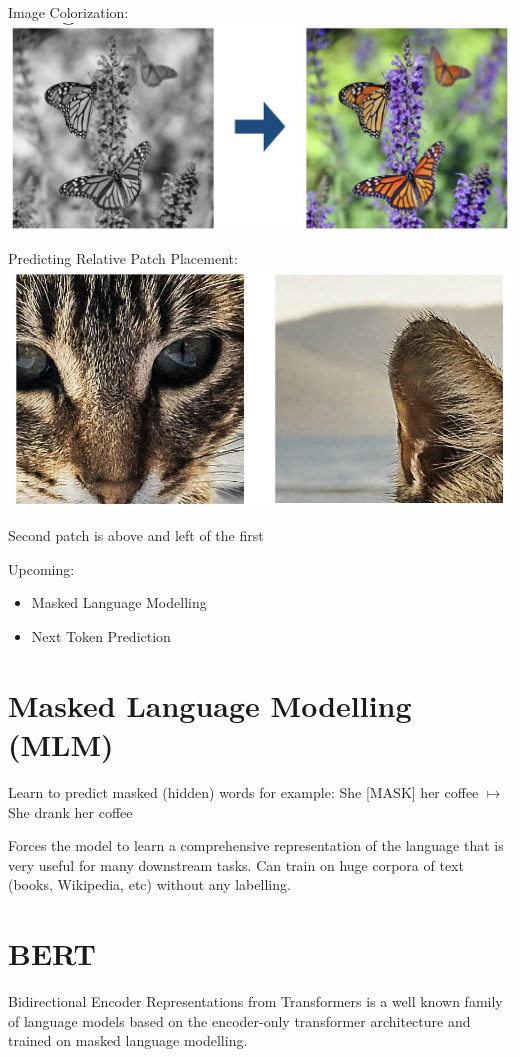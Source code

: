 \documentclass[10pt]{article}
\begin{document}
Image Colorization:
\includegraphics[max width=\textwidth, center]{2024_01_08_7c14f4867d7823fc5a52g-03(1)}

Predicting Relative Patch Placement:
\includegraphics[max width=\textwidth, center]{2024_01_08_7c14f4867d7823fc5a52g-03(2)}

Second patch is above and left of the first

Upcoming:

\begin{itemize}
  \item Masked Language Modelling
  \item Next Token Prediction
\end{itemize}

\section*{Masked Language Modelling (MLM)}
Learn to predict masked (hidden) words for example: She [MASK] her coffee $\mapsto$ She drank her coffee

Forces the model to learn a comprehensive representation of the language that is very useful for many downstream tasks. Can train on huge corpora of text (books, Wikipedia, etc) without any labelling.

\section*{BERT}
Bidirectional Encoder Representations from Transformers is a well known family of language models based on the encoder-only transformer architecture and trained on masked language modelling.
\end{document}
